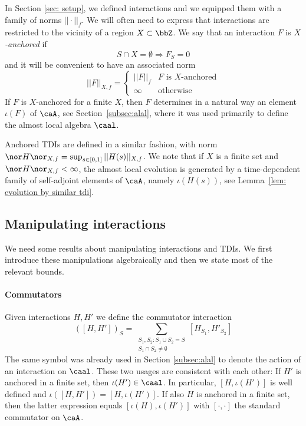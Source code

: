 In Section \ref{sec: setup}, we defined interactions and we equipped them with a family of norms $||\cdot||_f$. We will often need to express that interactions are restricted to the vicinity of a region $X\subset\bbZ$. We say that an interaction $F$ is \emph{$X$-anchored} if 
$$
S \cap X=\emptyset\Rightarrow  F_S=0
$$
and it will be convenient to have an associated norm
%
\begin{equation}\label{AnchoredInt}
	||F||_{X,f}=\begin{cases} ||F||_{f}   & \text{$F$ is $X$-anchored} \\
		\infty  &   \text{otherwise}
	\end{cases}
\end{equation}
%
If  $ F$ is $X$-anchored for a finite $X$, 
then $F$ determines in a natural way an element $\iota(F)$ of $\caA$, see Section~\ref{subsec:alal}, where it was used primarily to define the almost local algebra $\caal$.

Anchored TDIs are defined in a similar fashion, with norm $
\nor H \nor_{X,f}=\sup_{s\in[0,1]} ||H(s)||_{X,f}$. We note that if $X$ is a finite set and $\nor H \nor_{X,f}<\infty$, the almost local evolution is generated by a time-dependent family of self-adjoint elements of $\caA$, namely $\iota(H(s))$, see Lemma~\ref{lem: evolution by similar tdi}.


\subsection{Manipulating interactions} \label{sec: manipulating interactions}
We need some results about manipulating interactions and TDIs.
We first introduce these manipulations algebraically and then we state most of the relevant bounds. 
\paragraph{Commutators} Given interactions $H,H'$ we define the commutator interaction
$$
([H,H'])_S= \sum_{\substack{ S_1,S_2:  S_1\cup S_2=S \\  S_1 \cap S_2 \neq\emptyset} }   [H_{S_1},H'_{S_2}]
$$
The same symbol was already used in Section \ref{subsec:alal}  to denote the action of an interaction on $\caal$. These two usages are consistent with each other:  If $H'$ is anchored in a finite set, then $\iota(H')\in\caal$. In particular, $[H,\iota(H')]$ is well defined and $\iota([H,H'])=[H,\iota(H')]$. If also $H$ is anchored in a finite set, then the latter expression equals  $[\iota(H),\iota(H')]$ with $[\cdot,\cdot]$ the standard commutator on $\caA$. 




